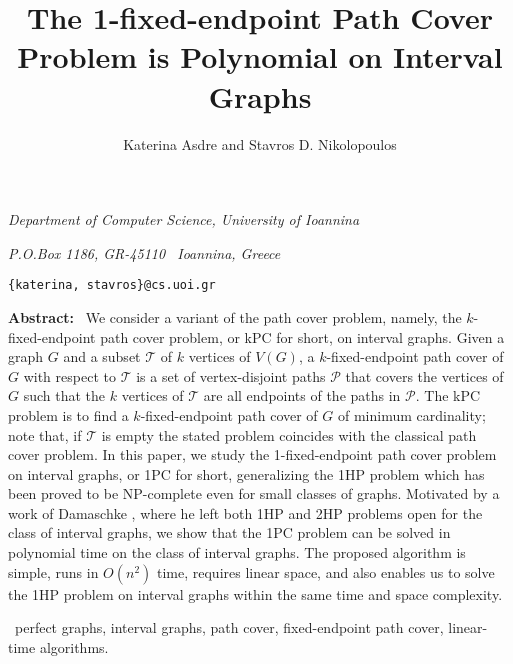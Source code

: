 \documentclass[10pt]{article}
\title{\bf The 1-fixed-endpoint Path Cover Problem is Polynomial on Interval Graphs \vspace{0.4cm}}
\author{\large Katerina Asdre \s and \s Stavros D. Nikolopoulos}
\date{}
\def\s{\ }
\begin{document}
\maketitle

\vspace{-0.6cm}

\centerline{\it Department of Computer Science, University of
Ioannina}

\centerline{\it P.O.Box 1186, GR-45110 \s Ioannina, Greece}

\centerline{\tt \{katerina, stavros\}@cs.uoi.gr}

\vskip 0.3in

\begin{center}
\noindent
\parbox{5.5in}
{{\bf Abstract:} \s We consider a variant of the path cover
problem, namely, the $k$-fixed-endpoint path cover problem, or kPC
for short, on interval graphs. Given a graph $G$ and a subset
$\mathcal{T}$ of $k$ vertices of $V(G)$, a $k$-fixed-endpoint path
cover of $G$ with respect to $\mathcal{T}$ is a set of
vertex-disjoint paths $\mathcal{P}$ that covers the vertices of
$G$ such that the $k$ vertices of $\mathcal{T}$ are all endpoints
of the paths in $\mathcal{P}$. The kPC problem is to find a
$k$-fixed-endpoint path cover of $G$ of minimum cardinality; note
that, if $\mathcal{T}$ is empty the stated problem coincides with
the classical path cover problem. In this paper, we study the
1-fixed-endpoint path cover problem on interval graphs, or 1PC for
short, generalizing the 1HP problem which has been proved to be
NP-complete even for small classes of graphs. Motivated by a work
of Damaschke \cite{Damaschke}, where he left both 1HP and 2HP
problems open for the class of interval graphs, we show that the
1PC problem can be solved in polynomial time on the class of
interval graphs. The proposed algorithm is simple, runs in
$O(n^2)$ time, requires linear space, and also enables us to solve
the 1HP problem on interval graphs within the same time and space
complexity.


\bigskip
{} \s perfect graphs, interval graphs, path
cover, fixed-endpoint path cover, linear-time algorithms.}
\end{center}
\end{document}
